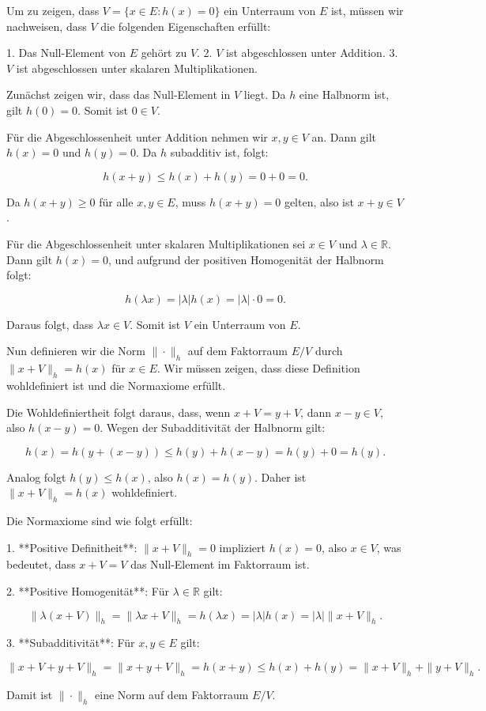 Um zu zeigen, dass $V = \{x \in E : h(x) = 0\}$ ein Unterraum von $E$ ist, müssen wir nachweisen, dass $V$ die folgenden Eigenschaften erfüllt:

1. Das Null-Element von $E$ gehört zu $V$.
2. $V$ ist abgeschlossen unter Addition.
3. $V$ ist abgeschlossen unter skalaren Multiplikationen.

Zunächst zeigen wir, dass das Null-Element in $V$ liegt. Da $h$ eine Halbnorm ist, gilt $h(0) = 0$. Somit ist $0 \in V$.

Für die Abgeschlossenheit unter Addition nehmen wir $x, y \in V$ an. Dann gilt $h(x) = 0$ und $h(y) = 0$. Da $h$ subadditiv ist, folgt:

\[
h(x + y) \leq h(x) + h(y) = 0 + 0 = 0.
\]

Da $h(x + y) \geq 0$ für alle $x, y \in E$, muss $h(x + y) = 0$ gelten, also ist $x + y \in V$.

Für die Abgeschlossenheit unter skalaren Multiplikationen sei $x \in V$ und $\lambda \in \mathbb{R}$. Dann gilt $h(x) = 0$, und aufgrund der positiven Homogenität der Halbnorm folgt:

\[
h(\lambda x) = |\lambda| h(x) = |\lambda| \cdot 0 = 0.
\]

Daraus folgt, dass $\lambda x \in V$. Somit ist $V$ ein Unterraum von $E$.

Nun definieren wir die Norm $\|\cdot\|_h$ auf dem Faktorraum $E / V$ durch $\|x + V\|_h = h(x)$ für $x \in E$. Wir müssen zeigen, dass diese Definition wohldefiniert ist und die Normaxiome erfüllt.

Die Wohldefiniertheit folgt daraus, dass, wenn $x + V = y + V$, dann $x - y \in V$, also $h(x - y) = 0$. Wegen der Subadditivität der Halbnorm gilt:

\[
h(x) = h(y + (x - y)) \leq h(y) + h(x - y) = h(y) + 0 = h(y).
\]

Analog folgt $h(y) \leq h(x)$, also $h(x) = h(y)$. Daher ist $\|x + V\|_h = h(x)$ wohldefiniert.

Die Normaxiome sind wie folgt erfüllt:

1. **Positive Definitheit**: $\|x + V\|_h = 0$ impliziert $h(x) = 0$, also $x \in V$, was bedeutet, dass $x + V = V$ das Null-Element im Faktorraum ist.

2. **Positive Homogenität**: Für $\lambda \in \mathbb{R}$ gilt:

\[
\|\lambda(x + V)\|_h = \|\lambda x + V\|_h = h(\lambda x) = |\lambda| h(x) = |\lambda| \|x + V\|_h.
\]

3. **Subadditivität**: Für $x, y \in E$ gilt:

\[
\|x + V + y + V\|_h = \|x + y + V\|_h = h(x + y) \leq h(x) + h(y) = \|x + V\|_h + \|y + V\|_h.
\]

Damit ist $\|\cdot\|_h$ eine Norm auf dem Faktorraum $E / V$.